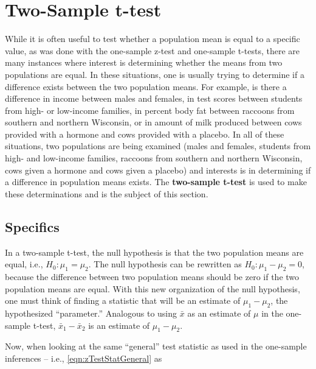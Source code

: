 \documentclass[10pt,openany]{book}\usepackage[]{graphicx}\usepackage[]{color}
\begin{document}
\section{Two-Sample t-test} \label{sect:t2test}
While it is often useful to test whether a population mean is equal to a specific value, as was done with the one-sample z-test and one-sample t-tests, there are many instances where interest is determining whether the means from two populations are equal.  In these situations, one is usually trying to determine if a difference exists between the two population means.  For example, is there a difference in income between males and females, in test scores between students from high- or low-income families, in percent body fat between raccoons from southern and northern Wisconsin, or in amount of milk produced between cows provided with a hormone and cows provided with a placebo.  In all of these situations, two populations are being examined (males and females, students from high- and low-income families, raccoons from southern and northern Wisconsin, cows given a hormone and cows given a placebo) and interests is in determining if a difference in population means exists.  The \textbf{two-sample t-test} is used to make these determinations and is the subject of this section.

\subsection{Specifics}
In a two-sample t-test, the null hypothesis is that the two population means are equal, i.e., $H_{0}:\mu_{1}=\mu_{2}$.  The null hypothesis can be rewritten as $H_{0}:\mu_{1}-\mu_{2}=0$, because the difference between two population means should be zero if the two population means are equal.  With this new organization of the null hypothesis, one must think of finding a statistic that will be an estimate of $\mu_{1}-\mu_{2}$, the hypothesized ``parameter.''  Analogous to using $\bar{x}$ as an estimate of $\mu$ in the one-sample t-test, $\bar{x}_{1}-\bar{x}_{2}$ is an estimate of $\mu_{1}-\mu_{2}$.


Now, when looking at the same ``general'' test statistic as used in the one-sample inferences -- i.e., \eqref{eqn:zTestStatGeneral} as
\end{document}
